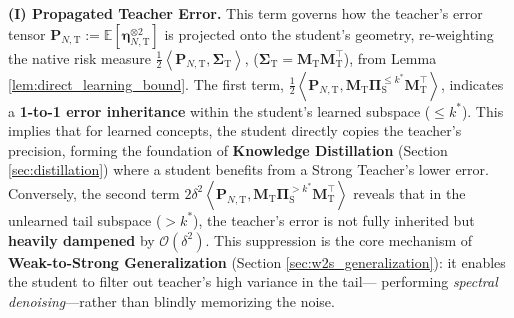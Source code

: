 \documentclass{article}
\theoremstyle{definition}
\theoremstyle{definition}
\theoremstyle{plain}
\theoremstyle{plain}
\theoremstyle{plain}
\theoremstyle{plain}
\theoremstyle{plain}
\newcommand{\bs}[1]{\boldsymbol{\mathbf{#1}}}
\newcommand{\Ex}{\mathbb{E}}
\newcommand{\te}{\mathrm{T}}
\newcommand{\st}{\mathrm{S}}
\newcommand{\M}{\mathbf{M}}
\newcommand{\Sig}{\mathbf{\Sigma}}
\newcommand{\inner}[1]{\left\langle#1\right\rangle}
\begin{document}
\textbf{(I) Propagated Teacher Error.}
This term governs how the teacher's error tensor $\mathbf{P}_{N,\te} := \Ex[\bs\eta_{N,\te}^{\otimes 2}]$ is projected onto the student's geometry, re-weighting the native risk measure $\frac{1}{2}\inner{\mathbf{P}_{N,\te}, \mathbf{\Sigma}_\te}$, ($\Sig_\te = \M_\te\M_\te^\top$), from Lemma \ref{lem:direct_learning_bound}.
The first term, $\frac{1}{2}\inner{\bs P_{N,\te},\M_\te\bs \Pi_{\st}^{\leq k^*}\M_\te^\top}$, indicates a \textbf{1-to-1 error inheritance} within the student's learned subspace ($\le k^*$). This implies that for learned concepts, the student directly copies the teacher's precision, forming the foundation of \textbf{Knowledge Distillation} (Section \ref{sec:distillation}) where a student benefits from a Strong Teacher's lower error.
Conversely, the second term $2\delta^2\inner{\bs P_{N,\te},\M_\te\bs \Pi_{\st}^{> k^*}\M_\te^\top}$ reveals that in the unlearned tail subspace ($> k^*$), the teacher's error is not fully inherited but \textbf{heavily dampened} by $\mathcal{O}(\delta^2)$. This suppression is the core mechanism of \textbf{Weak-to-Strong Generalization} (Section \ref{sec:w2s_generalization}): it enables the student to filter out teacher's high variance in the tail— performing \textit{spectral denoising}—rather than blindly memorizing the noise.


\end{document}
